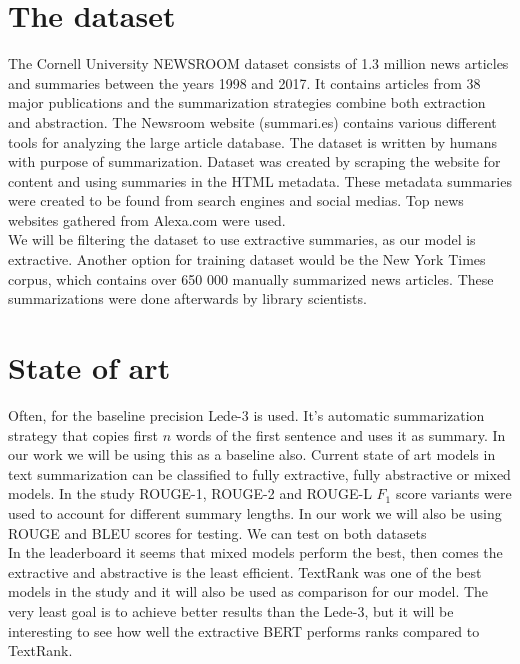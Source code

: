 \documentclass{article}
\begin{document}
\section{The dataset}

The Cornell University NEWSROOM dataset \cite{dataset} consists of 1.3 million news articles and summaries between the years 1998 and 2017. It contains articles from 38 major publications and the summarization strategies combine both extraction and abstraction. The Newsroom website (summari.es) contains various different tools for analyzing the large article database. The dataset is written by humans with purpose of summarization. Dataset was created by scraping the website for content and using summaries in the HTML metadata. These metadata summaries were created to be found from search engines and social medias. Top news websites gathered from Alexa.com were used. \\

\noindent
We will be filtering the dataset \cite{dataset} to use extractive summaries, as our model is extractive. Another option for training dataset would be the New York Times corpus, which contains over 650 000 manually summarized news articles. These summarizations were done afterwards by library scientists. \cite{ny_dataset} 


\section{State of art }

Often, for the baseline precision Lede-3 is used. It's automatic summarization strategy that copies first $n$ words of the first sentence and uses it as summary. In our work we will be using this as a baseline also. Current state of art models in text summarization can be classified to fully extractive, fully abstractive or mixed models. In the study \cite{dataset} ROUGE-1, ROUGE-2 and ROUGE-L $F_1$ score variants were used to account for different summary lengths. In our work we will also be using ROUGE and BLEU scores for testing. We can test on both datasets \cite{dataset} \cite{ny_dataset}\\

\noindent
In the leaderboard it seems that mixed models perform the best, then comes the extractive and abstractive is the least efficient. TextRank was one of the best models in the study \cite{dataset} and it will also be used as comparison for our model.
The very least goal is to achieve better results than the Lede-3, but it will be interesting to see how well the extractive BERT performs ranks compared to TextRank. 



\end{document}
